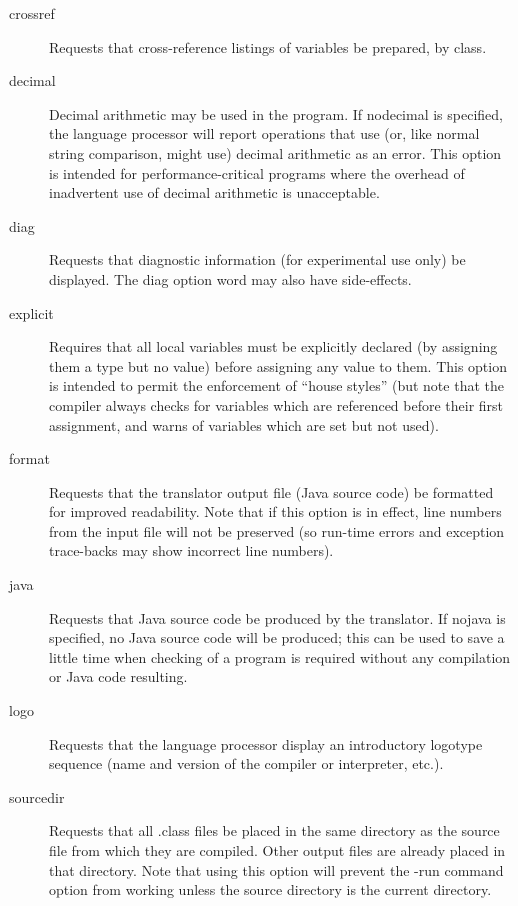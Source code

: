 \begin{description}
\item[crossref]
Requests that cross-reference listings of variables be prepared, by class.
\item[decimal]
Decimal arithmetic may be used in the program. If nodecimal is specified, the language processor will report operations that use (or, like normal string comparison, might use) decimal arithmetic as an error. This option is intended for performance-critical programs where the overhead of inadvertent use of decimal arithmetic is unacceptable.
\item[diag]
Requests that diagnostic information (for experimental use only) be displayed. The diag option word may also have side-effects.
\item[explicit]
Requires that all local variables must be explicitly declared (by assigning them a type but no value) before assigning any value to them. This option is intended to permit the enforcement of “house styles” (but note that the \nr{} compiler always checks for variables which are referenced before their first assignment, and warns of variables which are set but not used).
\item[format]
Requests that the translator output file (Java source code) be formatted for improved readability. Note that if this option is in effect, line numbers from the input file will not be preserved (so run-time errors and exception trace-backs may show incorrect line numbers).
\item[java]
Requests that Java source code be produced by the translator. If nojava is specified, no Java source code will be produced; this can be used to save a little time when checking of a program is required without any compilation or Java code resulting.
\item[logo]
Requests that the language processor display an introductory logotype sequence (name and version of the compiler or interpreter, etc.).
\item[sourcedir]
Requests that all .class files be placed in the same directory as the source file from which they are compiled. Other output files are already placed in that directory. Note that using this option will prevent the -run command option from working unless the source directory is the current directory.

\end{description}
